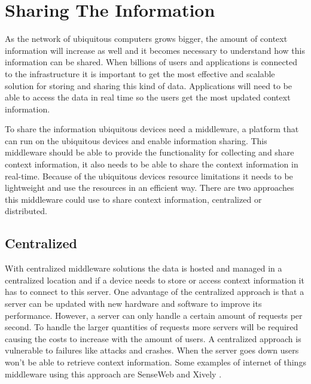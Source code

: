 \section{Sharing The Information}
As the network of ubiquitous computers grows bigger, the amount of context information will increase as well and it becomes necessary to understand how this information can be shared. When billions of users and applications is connected to the infrastructure it is important to get the most effective and scalable solution for storing and sharing this kind of data. Applications will need to be able to access the data in real time so the users get the most updated context information. 

To share the information ubiquitous devices need a middleware, a platform that can run on the ubiquitous devices and enable information sharing. This middleware should be able to provide the functionality for collecting and share context information, it also needs to be able to share the context information in real-time. Because of the ubiquitous devices resource limitations it needs to be lightweight and use the resources in an efficient way. There are two approaches this middleware could use to share context information, centralized or distributed.

\subsection{Centralized}
With centralized middleware solutions the data is hosted and managed in a centralized location and if a device needs to store or access context information it has to connect to this server. One advantage of the centralized approach is that a server can be updated with new hardware and software to improve its performance. 
However, a server can only handle a certain amount of requests per second. To handle the larger quantities of requests more servers will be required causing the costs to increase with the amount of users. A centralized approach is vulnerable to failures like attacks and crashes. When the server goes down users won't be able to retrieve context information. Some examples of internet of things middleware using this approach are SenseWeb \cite{senseweb} and Xively \cite{xively}.


